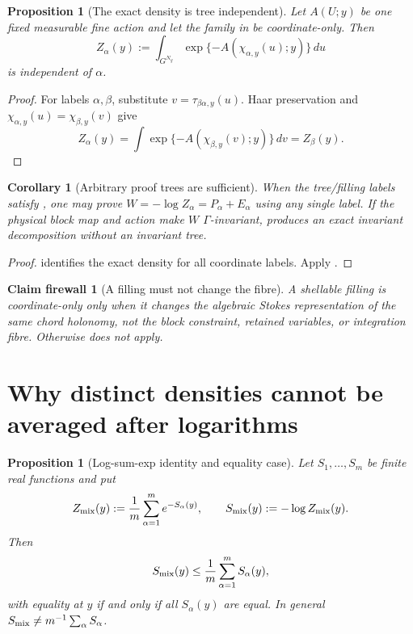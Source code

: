 \documentclass[11pt,oneside]{book}
\newtheorem{proposition}[theorem]{Proposition}
\newtheorem{corollary}[theorem]{Corollary}
\newtheorem{firewall}[theorem]{Claim firewall}
\theoremstyle{definition}
\theoremstyle{remark}
\begin{document}
\begin{proposition}[The exact density is tree independent]
\label{prop:e8v4-tree-independent}
Let \(A(U;y)\) be one fixed measurable fine action and let the family
in  be coordinate-only.  Then
\[
 Z_\alpha(y):=\int_{G^{N_y}}
 \exp\{-A(\chi_{\alpha,y}(u);y)\}\,du                \label{eq:e8v4-Zalpha}
\]
is independent of \(\alpha\).
\end{proposition}

\begin{proof}
For labels \(\alpha,\beta\), substitute
\(v=\tau_{\beta\alpha,y}(u)\).  Haar preservation and
\(\chi_{\alpha,y}(u)=\chi_{\beta,y}(v)\) give
\[
 Z_\alpha(y)
 =\int\exp\{-A(\chi_{\beta,y}(v);y)\}\,dv
 =Z_\beta(y).
\]
\end{proof}

\begin{corollary}[Arbitrary proof trees are sufficient]
\label{cor:e8v4-arbitrary-tree}
When the tree/filling labels satisfy
, one may prove
\(W=-\log Z_\alpha=P_\alpha+E_\alpha\) using any single label.
If the physical block map and action make \(W\) \(\Gamma\)-invariant,
 produces an exact invariant decomposition
without an invariant tree.
\end{corollary}

\begin{proof}
 identifies the exact density for
all coordinate labels.  Apply .
\end{proof}

\begin{firewall}[A filling must not change the fibre]
\label{fire:e8v4-filling}
A shellable filling is coordinate-only only when it changes the
algebraic Stokes representation of the same chord holonomy, not the
block constraint, retained variables, or integration fibre.
Otherwise  does not apply.
\end{firewall}

\section{Why distinct densities cannot be averaged after logarithms}
\label{sec:e8v4-logsum}

\begin{proposition}[Log-sum-exp identity and equality case]
\label{prop:e8v4-logsum}
Let \(S_1,\ldots,S_m\) be finite real functions and put
\[
 Z_{\rm mix}(y):=\frac1m\sum_{\alpha=1}^m e^{-S_\alpha(y)},
 \qquad
 S_{\rm mix}(y):=-\log Z_{\rm mix}(y).               \label{eq:e8v4-mix}
\]
Then
\[
 S_{\rm mix}(y)\leq \frac1m\sum_{\alpha=1}^mS_\alpha(y),
                                                        \label{eq:e8v4-jensen}
\]
with equality at \(y\) if and only if all \(S_\alpha(y)\) are equal.
In general \(S_{\rm mix}\neq m^{-1}\sum_\alpha S_\alpha\).
\end{proposition}
\end{document}
